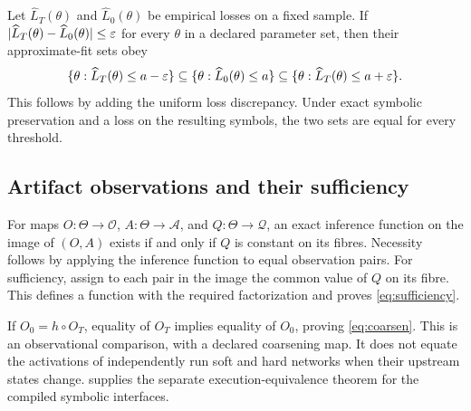 Let $\widehat L_T(\theta)$ and $\widehat L_0(\theta)$ be empirical losses on a fixed sample. If $|\widehat L_T(\theta)-\widehat L_0(\theta)|\le\varepsilon$ for every $\theta$ in a declared parameter set, then their approximate-fit sets obey
\[
 \{\theta:\widehat L_T(\theta)\le a-\varepsilon\}
 \subseteq\{\theta:\widehat L_0(\theta)\le a\}
 \subseteq\{\theta:\widehat L_T(\theta)\le a+\varepsilon\}.
\]
This follows by adding the uniform loss discrepancy. Under exact symbolic preservation and a loss on the resulting symbols, the two sets are equal for every threshold.

\subsection{Artifact observations and their sufficiency}
For maps $O:\Theta\to\mathcal O$, $A:\Theta\to\mathcal A$, and $Q:\Theta\to\mathcal Q$, an exact inference function on the image of $(O,A)$ exists if and only if $Q$ is constant on its fibres. Necessity follows by applying the inference function to equal observation pairs. For sufficiency, assign to each pair in the image the common value of $Q$ on its fibre. This defines a function with the required factorization and proves \eqref{eq:sufficiency}.

If $O_0=h\circ O_T$, equality of $O_T$ implies equality of $O_0$, proving \eqref{eq:coarsen}. This is an observational comparison, with a declared coarsening map. It does not equate the activations of independently run soft and hard networks when their upstream states change.  supplies the separate execution-equivalence theorem for the compiled symbolic interfaces.

